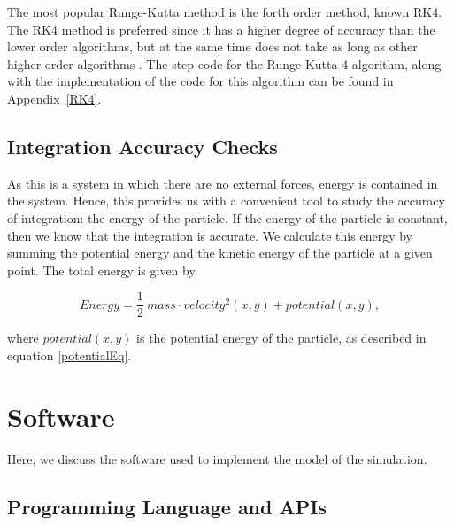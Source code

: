 \documentclass[12pt]{article} %
\begin{document}
 The most popular Runge-Kutta method is the forth order method, known RK4. The RK4 method is preferred since it has a higher degree of accuracy than the lower order algorithms, but at the same time does not take as long as other higher order algorithms \cite{OldRunge}. The step code for the Runge-Kutta 4 algorithm, along with the implementation of the code for this algorithm can be found in Appendix~\ref{RK4}.\\
 
 
 



\subsection{Integration Accuracy Checks}
\label{Section:IntegrationAccuracyCheck}

As this is a system in which there are no external forces, energy is contained in the system. Hence, this provides us with a convenient tool to study the accuracy of integration: the energy of the particle. If the energy of the particle is constant, then we know that the integration is accurate. We calculate this energy by summing the potential energy and the kinetic energy of the particle at a given point. The total energy is given by 

$$ Energy = \frac{1}{2} \ mass \cdot velocity^2(x,y) + potential(x,y),$$

\noindent where $potential(x,y)$ is the potential energy of the particle, as described in equation \ref{potentialEq}.



\section{Software} \label{Sec4:Software}%
Here, we discuss the software used to implement the model of the simulation. \\



\subsection{Programming Language and APIs} \label{Prog Lang and APIs}
\end{document}

